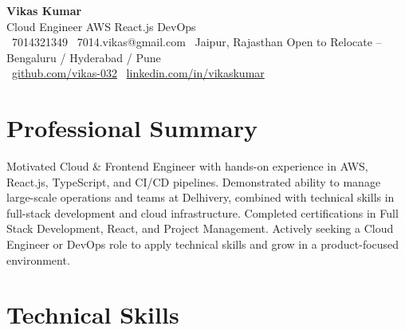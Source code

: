 \documentclass[10pt, a4paper]{article}
\begin{document}

\begin{mdframed}[
  backgroundcolor=myDark,
  linewidth=0pt,
  innertopmargin=6pt, innerbottommargin=6pt,
  innerleftmargin=10pt, innerrightmargin=10pt,
  skipabove=0pt, skipbelow=4pt,
  roundcorner=4pt
]
  {\LARGE\bfseries\color{white} Vikas Kumar}\\[3pt]
  {\small\color{mySubt} Cloud Engineer \textbar{} AWS \textbar{} React.js \textbar{} DevOps}\\[5pt]
  {\footnotesize\color{white}
    \faPhone\ 7014321349 \quad\textbar\quad
    \faEnvelope\ 7014.vikas@gmail.com \quad\textbar\quad
    \faMapMarker*\ Jaipur, Rajasthan \textbar{} Open to Relocate -- Bengaluru / Hyderabad / Pune
  }\\[2pt]
  {\footnotesize\color{white}
    \faGithub\ \href{https://github.com/vikas-032}{github.com/vikas-032}
    \quad\textbar\quad
    \faLinkedin\ \href{https://linkedin.com/in/vikaskumar}{linkedin.com/in/vikaskumar}
  }
\end{mdframed}

\section{Professional Summary}
{\small\color{myBody}
Motivated Cloud \& Frontend Engineer with hands-on experience in AWS, React.js, TypeScript, and CI/CD
pipelines. Demonstrated ability to manage large-scale operations and teams at Delhivery, combined with
technical skills in full-stack development and cloud infrastructure. Completed certifications in Full Stack
Development, React, and Project Management. Actively seeking a Cloud Engineer or DevOps role to apply
technical skills and grow in a product-focused environment.}

\section{Technical Skills}
\end{document}
